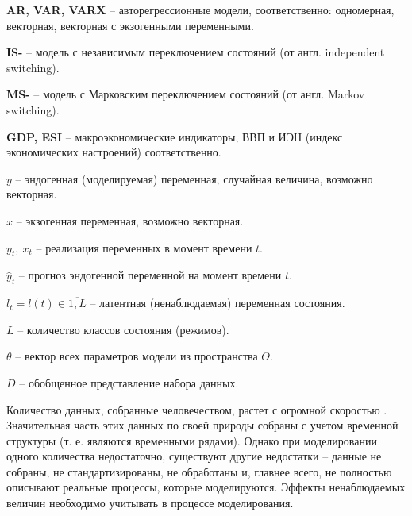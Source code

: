 \documentclass[a4paper,14pt]{extreport}
\begin{document}
\clearpage
\renewcommand{\contentsname}{Содержание}
\tableofcontents





\textbf{AR, VAR, VARX} -- авторегрессионные модели, соответственно: одномерная, векторная, векторная с экзогенными переменными.

\textbf{IS-} -- модель с независимым переключением состояний (от англ. independent switching).

\textbf{MS-} -- модель с Марковским переключением состояний (от англ. Markov switching).

\textbf{GDP, ESI} -- макроэкономические индикаторы, ВВП и ИЭН (индекс экономических настроений) соответственно.



$y$ -- эндогенная (моделируемая) переменная, случайная величина, возможно векторная.

$x$ -- экзогенная переменная, возможно векторная.

$y_t, \: x_t$ -- реализация переменных в момент времени $t$.

$\hat{y}_t$ -- прогноз эндогенной переменной на момент времени $t$.

$l_t = l(t) \in \overline{1,L}$ -- латентная (ненаблюдаемая) переменная состояния.

$L$ -- количество классов состояния (режимов).

$\theta$ -- вектор всех параметров модели из пространства $\Theta$.

$D$ -- обобщенное представление набора данных.



Количество данных, собранные человечеством, растет с огромной скоростью \cite{idc_data_2025}. Значительная часть этих данных по своей природы собраны с учетом временной структуры (т. е. являются временными рядами). Однако при моделировании одного количества недостаточно, существуют другие недостатки -- данные не собраны, не стандартизированы, не обработаны и, главнее всего, не полностью описывают реальные процессы, которые моделируются. Эффекты ненаблюдаемых величин необходимо учитывать в процессе моделирования.
\end{document}
